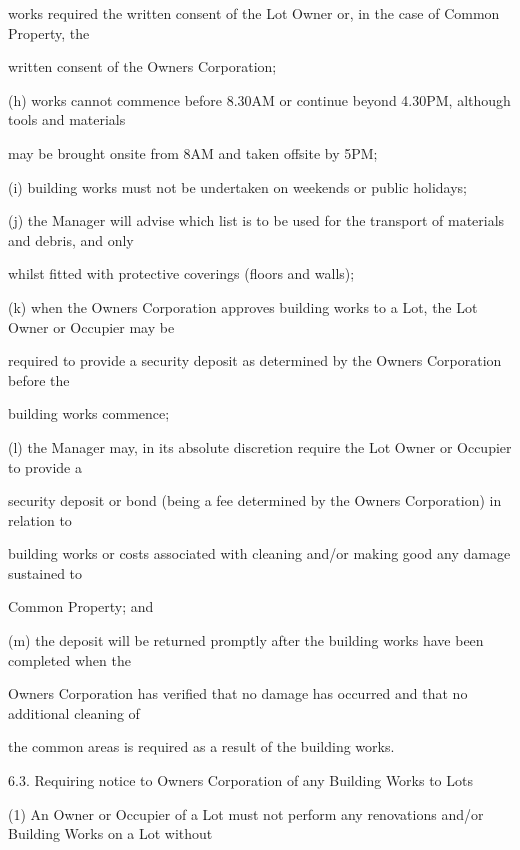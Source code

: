 \documentclass{article}
\begin{document}
{\fontsize{10.02}{1}works required the written consent of the Lot Owner or, in the case of Common Property, the }

{\fontsize{10.02}{1}written consent of the Owners Corporation; }

{\fontsize{9.962}{1}(h) works cannot commence before 8.30AM or continue beyond 4.30PM, although tools and materials }

{\fontsize{10.02}{1}may be brought onsite from 8AM and taken offsite by 5PM; }

\newpage

{\fontsize{9.962}{1}(i) building works must not be undertaken on weekends or public holidays; }

{\fontsize{9.962}{1}(j) the Manager will advise which list is to be used for the transport of materials and debris, and only }

{\fontsize{10.02}{1}whilst fitted with protective coverings (floors and walls); }

{\fontsize{9.962}{1}(k) when the Owners Corporation approves building works to a Lot, the Lot Owner or Occupier may be }

{\fontsize{10.02}{1}required to provide a security deposit as determined by the Owners Corporation before the }

{\fontsize{10.02}{1}building works commence; }

{\fontsize{9.962}{1}(l) the Manager may, in its absolute discretion require the Lot Owner or Occupier to provide a }

{\fontsize{10.02}{1}security deposit or bond (being a fee determined by the Owners Corporation) in relation to }

{\fontsize{10.02}{1}building works or costs associated with cleaning and/or making good any damage sustained to }

{\fontsize{10.02}{1}Common Property; and }

{\fontsize{9.962}{1}(m) the deposit will be returned promptly after the building works have been completed when the }

{\fontsize{10.02}{1}Owners Corporation has verified that no damage has occurred and that no additional cleaning of }

{\fontsize{10.02}{1}the common areas is required as a result of the building works. }

{\fontsize{9.99}{1}6.3. Requiring notice to Owners Corporation of any Building Works to Lots }

{\fontsize{9.962}{1}(1) An Owner or Occupier of a Lot must not perform any renovations and/or Building Works on a Lot without }
\end{document}

